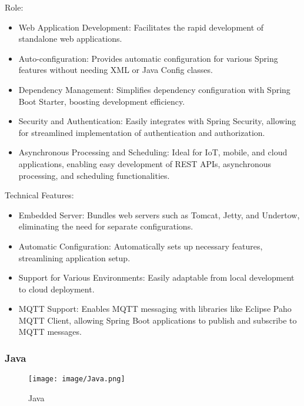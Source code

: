 \documentclass[conference]{IEEEtran}
\begin{document}
Role:
\begin{itemize}
\item Web Application Development: Facilitates the rapid development of standalone web applications.\\
\item Auto-configuration: Provides automatic configuration for various Spring features without needing XML or Java Config classes.\\
\item  Dependency Management: Simplifies dependency configuration with Spring Boot Starter, boosting development efficiency. \\
\item Security and Authentication: Easily integrates with Spring Security, allowing for streamlined implementation of authentication and authorization. \\
\item Asynchronous Processing and Scheduling: Ideal for IoT, mobile, and cloud applications, enabling easy development of REST APIs, asynchronous processing, and scheduling functionalities. \\
\end{itemize}

Technical Features: 
\begin{itemize}
    \item Embedded Server: Bundles web servers such as Tomcat, Jetty, and Undertow, eliminating the need for separate configurations.\\
    \item Automatic Configuration: Automatically sets up necessary features, streamlining application setup.\\
    \item Support for Various Environments: Easily adaptable from local development to cloud deployment.\\
    \item MQTT Support: Enables MQTT messaging with libraries like Eclipse Paho MQTT Client, allowing Spring Boot applications to publish and subscribe to MQTT messages.\\
\end{itemize}



\subsubsection{Java}

\begin{figure}[h!]
    \centering
    \texttt{[image: image/Java.png]}
    \caption{Java}
    \label{fig:enter-label}
\end{figure}
\end{document}
